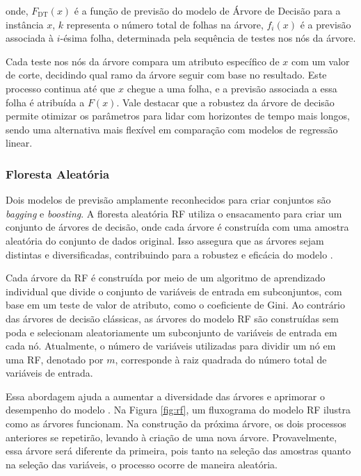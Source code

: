 \noindent onde, $ F_{\text{DT}}(x) $ é a função de previsão do modelo de Árvore de Decisão para a instância $ x $, $ k $ representa o número total de folhas na árvore, $ f_i(x) $ é a previsão associada à $ i $-ésima folha, determinada pela sequência de testes nos nós da árvore.

Cada teste nos nós da árvore compara um atributo específico de $ x $ com um valor de corte, decidindo qual ramo da árvore seguir com base no resultado. Este processo continua até que $ x $ chegue a uma folha, e a previsão associada a essa folha é atribuída a $ F(x) $. Vale destacar que a robustez da árvore de decisão permite otimizar os parâmetros para lidar com horizontes de tempo mais longos, sendo uma alternativa mais flexível em comparação com modelos de regressão linear.
 
 
  
 \subsubsection{Floresta Aleat\'oria} \label{subsubsec:rf}
 
Dois modelos de previsão amplamente reconhecidos para criar conjuntos são \textit{bagging} e \textit{boosting}. A floresta aleatória RF utiliza o ensacamento para criar um conjunto de árvores de decisão, onde cada árvore é construída com uma amostra aleatória do conjunto de dados original. Isso assegura que as árvores sejam distintas e diversificadas, contribuindo para a robustez e eficácia do modelo \cite{SEMAN2023109269}.
 
 Cada árvore da RF é construída por meio de um algoritmo de aprendizado individual que divide o conjunto de variáveis de entrada em subconjuntos, com base em um teste de valor de atributo, como o coeficiente de Gini. Ao contrário das árvores de decisão clássicas, as árvores do modelo RF são construídas sem poda e selecionam aleatoriamente um subconjunto de variáveis de entrada em cada nó. Atualmente, o número de variáveis utilizadas para dividir um nó em uma RF, denotado por $m$, corresponde à raiz quadrada do número total de variáveis de entrada. 
 
 Essa abordagem ajuda a aumentar a diversidade das árvores e aprimorar o desempenho do modelo \cite{Pelletier2016156}. Na Figura \ref{fig:rf}, um fluxograma do modelo RF ilustra como as árvores funcionam.
 Na construção da próxima árvore, os dois processos anteriores se repetirão, levando à criação de uma nova árvore. Provavelmente, essa árvore será diferente da primeira, pois tanto na seleção das amostras quanto na seleção das variáveis, o processo ocorre de maneira aleatória.
  
